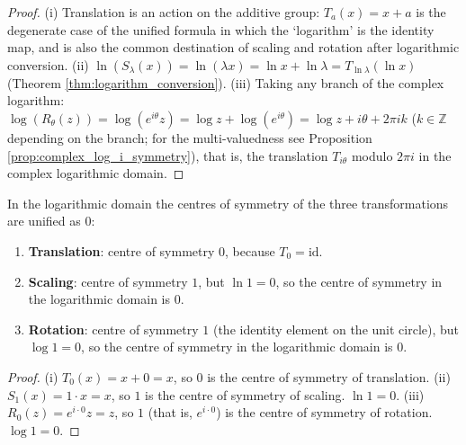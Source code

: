 \begin{proof}
(i) Translation is an action on the additive group: $T_a(x) = x + a$ is the degenerate case of the unified formula in which the `logarithm' is the identity map, and is also the common destination of scaling and rotation after logarithmic conversion.
(ii) $\ln(S_\lambda(x)) = \ln(\lambda x) = \ln x + \ln \lambda = T_{\ln\lambda}(\ln x)$ (Theorem \ref{thm:logarithm_conversion}).
(iii) Taking any branch of the complex logarithm: $\log(R_\theta(z)) = \log(e^{i\theta}z) = \log z + \log(e^{i\theta}) = \log z + i\theta + 2\pi i k$ ($k \in \mathbb{Z}$ depending on the branch; for the multi-valuedness see Proposition \ref{prop:complex_log_i_symmetry}), that is, the translation $T_{i\theta}$ modulo $2\pi i$ in the complex logarithmic domain.
\end{proof}

\begin{proposition}\label{prop:log_symmetry_centre_unification}
In the logarithmic domain the centres of symmetry of the three transformations are unified as $0$:
\begin{enumerate}[label=(\roman*)]
    \item \textbf{Translation}: centre of symmetry $0$, because $T_0 = \text{id}$.
    \item \textbf{Scaling}: centre of symmetry $1$, but $\ln 1 = 0$, so the centre of symmetry in the logarithmic domain is $0$.
    \item \textbf{Rotation}: centre of symmetry $1$ (the identity element on the unit circle), but $\log 1 = 0$, so the centre of symmetry in the logarithmic domain is $0$.
\end{enumerate}
\end{proposition}

\begin{proof}
(i) $T_0(x) = x + 0 = x$, so $0$ is the centre of symmetry of translation.
(ii) $S_1(x) = 1 \cdot x = x$, so $1$ is the centre of symmetry of scaling. $\ln 1 = 0$.
(iii) $R_0(z) = e^{i\cdot 0}z = z$, so $1$ (that is, $e^{i\cdot 0}$) is the centre of symmetry of rotation. $\log 1 = 0$.
\end{proof}


